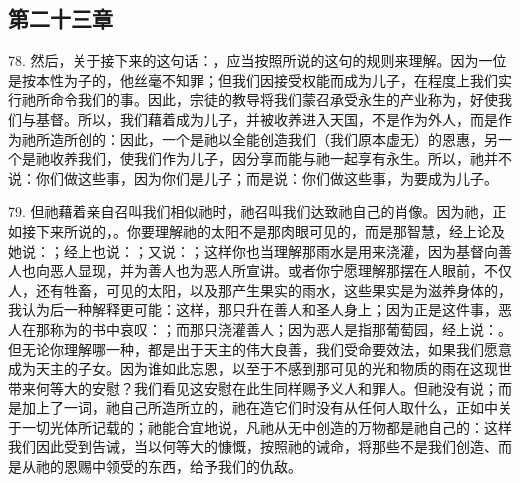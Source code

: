 
\subsection{第二十三章}

78. 然后，关于接下来的这句话：，应当按照所说的这句的规则来理解。因为一位是按本性为子的，他丝毫不知罪；但我们因接受权能而成为儿子，在程度上我们实行祂所命令我们的事。因此，宗徒的教导将我们蒙召承受永生的产业称为，好使我们与基督。所以，我们藉着成为儿子，并被收养进入天国，不是作为外人，而是作为祂所造所创的：因此，一个是祂以全能创造我们（我们原本虚无）的恩惠，另一个是祂收养我们，使我们作为儿子，因分享而能与祂一起享有永生。所以，祂并不说：你们做这些事，因为你们是儿子；而是说：你们做这些事，为要成为儿子。\par

79. 但祂藉着亲自召叫我们相似祂时，祂召叫我们达致祂自己的肖像。因为祂，正如接下来所说的，。你要理解祂的太阳不是那肉眼可见的，而是那智慧，经上论及她说：；经上也说：；又说：；这样你也当理解那雨水是用来浇灌，因为基督向善人也向恶人显现，并为善人也为恶人所宣讲。或者你宁愿理解那摆在人眼前，不仅人，还有牲畜，可见的太阳，以及那产生果实的雨水，这些果实是为滋养身体的，我认为后一种解释更可能：这样，那只升在善人和圣人身上；因为正是这件事，恶人在那称为的书中哀叹：；而那只浇灌善人；因为恶人是指那葡萄园，经上说：。但无论你理解哪一种，都是出于天主的伟大良善，我们受命要效法，如果我们愿意成为天主的子女。因为谁如此忘恩，以至于不感到那可见的光和物质的雨在这现世带来何等大的安慰？我们看见这安慰在此生同样赐予义人和罪人。但祂没有说；而是加上了一词，祂自己所造所立的，祂在造它们时没有从任何人取什么，正如中关于一切光体所记载的；祂能合宜地说，凡祂从无中创造的万物都是祂自己的：这样我们因此受到告诫，当以何等大的慷慨，按照祂的诫命，将那些不是我们创造、而是从祂的恩赐中领受的东西，给予我们的仇敌。\par

